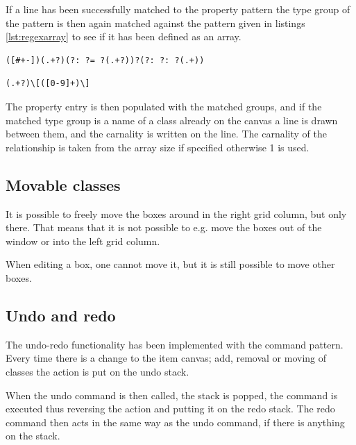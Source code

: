 If a line has been successfully matched to the property pattern the type group of the pattern is then again matched against the pattern given in listings \ref{lst:regexarray} to see if it has been defined as an array.

\begin{lstlisting}[caption={RegEx for property matching},label=lst:regexprop]
([#+-])(.+?)(?: ?= ?(.+?))?(?: ?: ?(.+))
\end{lstlisting}

\begin{lstlisting}[caption={RegEx for array matching},label=lst:regexarray]
(.+?)\[([0-9]+)\]
\end{lstlisting}

The property entry is then populated with the matched groups, and if the matched type group is a name of a class already on the canvas a line is drawn between them, and the carnality is written on the line.
The carnality of the relationship is taken from the array size if specified otherwise 1 is used.

\subsection{Movable classes}
It is possible to freely move the boxes around in the right grid column, but only there. That means that it is not possible to e.g. move the boxes out of the window or into the left grid column.

When editing a box, one cannot move it, but it is still possible to move other boxes.

\subsection{Undo and redo}
The undo-redo functionality has been implemented with the command pattern.
Every time there is a change to the item canvas; add, removal or moving of classes the action is put on the undo stack.

When the undo command is then called, the stack is popped, the command is executed thus reversing the action and putting it on the redo stack. The redo command then acts in the same way as the undo command, if there is anything on the stack.

